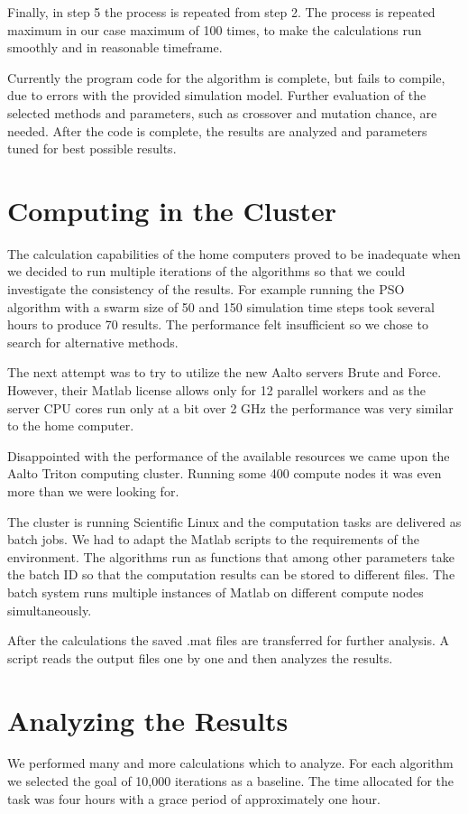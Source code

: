 \documentclass[twoside]{article}
\begin{document}
\begin{multicols}{2}
	Finally, in step 5 the process is repeated from step 2. The process is repeated maximum in our case maximum of 100 times, to make the calculations run smoothly and in reasonable timeframe.
	
	Currently the program code for the algorithm is complete, but fails to compile, due to errors with the provided simulation model. Further evaluation of the selected methods and parameters, such as crossover and mutation chance, are needed. After the code is complete, the results are analyzed and parameters tuned for best possible results.
	
	
	\section{Computing in the Cluster}
	The calculation capabilities of the home computers proved to be inadequate when we decided to run multiple iterations of the algorithms so that we could investigate the consistency of the results. For example running the PSO algorithm with a swarm size of 50 and 150 simulation time steps took several hours to produce 70 results. The performance felt insufficient so we chose to search for alternative methods.
	
	The next attempt was to try to utilize the new Aalto servers Brute and Force. However, their Matlab license allows only for 12 parallel workers and as the server CPU cores run only at a bit over 2 GHz the performance was very similar to the home computer.
	
	Disappointed with the performance of the available resources we came upon the Aalto Triton computing cluster. Running some 400 compute nodes it was even more than we were looking for.
	
	The cluster is running Scientific Linux and the computation tasks are delivered as batch jobs. We had to adapt the Matlab scripts to the requirements of the environment. The algorithms run as functions that among other parameters take the batch ID so that the computation results can be stored to different files. The batch system runs multiple instances of Matlab on different compute nodes simultaneously. 
	
	After the calculations the saved .mat files are transferred for further analysis. A script reads the output files one by one and then analyzes the results.
	
	
	
\section{Analyzing the Results}
We performed many and more calculations which to analyze. For each algorithm we selected the goal of 10,000 iterations as a baseline. The time allocated for the task was four hours with a grace period of approximately one hour. 


\end{multicols}
\end{document}
